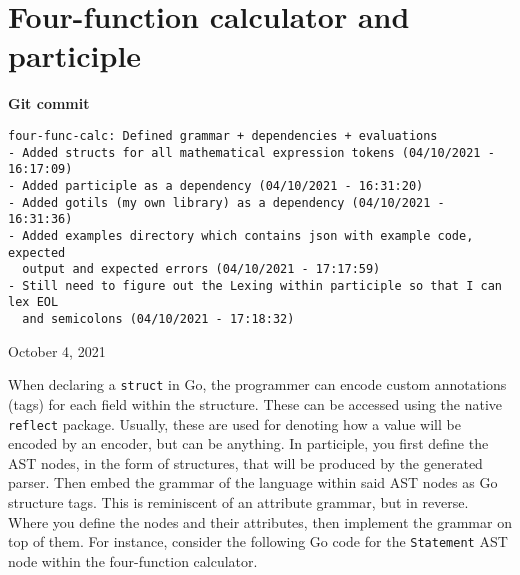\section{Four-function calculator and participle}
\label{sec:four-function-calc}

\begin{center}
    \textbf{Git commit}
    \begin{verbatim}
four-func-calc: Defined grammar + dependencies + evaluations
- Added structs for all mathematical expression tokens (04/10/2021 - 16:17:09)
- Added participle as a dependency (04/10/2021 - 16:31:20)
- Added gotils (my own library) as a dependency (04/10/2021 - 16:31:36)
- Added examples directory which contains json with example code, expected
  output and expected errors (04/10/2021 - 17:17:59)
- Still need to figure out the Lexing within participle so that I can lex EOL
  and semicolons (04/10/2021 - 17:18:32)
    \end{verbatim}
    \vspace{-1em}
    \tiny{October 4, 2021}
\end{center}

When declaring a \texttt{struct} in Go, the programmer can encode custom annotations (tags) for each field within the structure. These can be accessed using the native \verb|reflect| package. Usually, these are used for denoting how a value will be encoded by an encoder, but can be anything. In participle, you first define the AST nodes, in the form of structures, that will be produced by the generated parser. Then embed the grammar of the language within said AST nodes as Go structure tags. This is reminiscent of an attribute grammar, but in reverse. Where you define the nodes and their attributes, then implement the grammar on top of them. For instance, consider the following Go code for the \verb|Statement| AST node within the four-function calculator.

